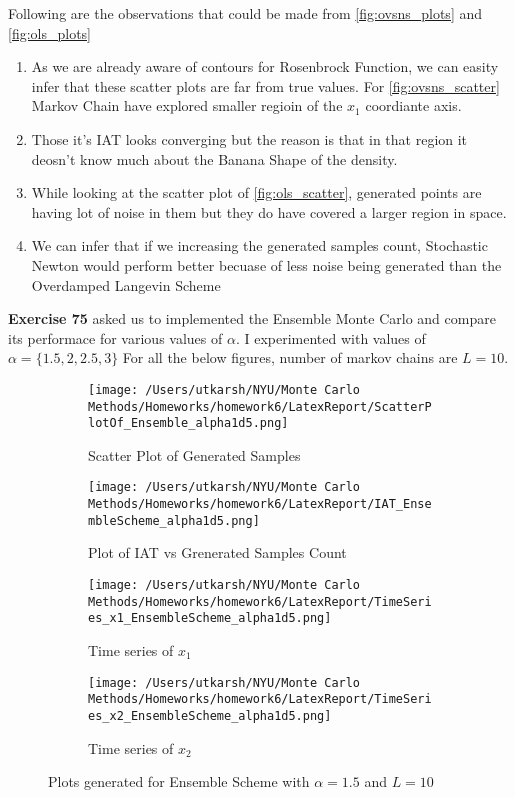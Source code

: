 \documentclass[11pt]{article}
\begin{document}
Following are the observations that could be made from \ref{fig:ovsns_plots} and \ref{fig:ols_plots}
\begin{enumerate}
	\item As we are already aware of contours for Rosenbrock Function, we can easity infer that these scatter plots are far from true values. For \ref{fig:ovsns_scatter} 
	Markov Chain have explored smaller regioin of the $x_1$ coordiante axis.
	\item Those it's IAT looks converging but the reason is that in that region it deosn't know much about the Banana Shape of the density.
	\item While looking at the scatter plot of \ref{fig:ols_scatter}, generated points are having lot of noise in them but they do have covered a larger region in space.
	\item We can infer that if we increasing the generated samples count, Stochastic Newton would perform better becuase of less noise being generated than the Overdamped Langevin Scheme
\end{enumerate}


\textbf{Exercise 75} asked us to implemented the Ensemble Monte Carlo and compare its performace for various values of $\alpha$. I experimented with values of $\alpha  = \{1.5, 2, 2.5, 3\}$
For all the below figures, number of markov chains are $L = 10$.
\begin{figure}[H]
	\centering
	\begin{subfigure}{.22\textwidth}
		\texttt{[image: /Users/utkarsh/NYU/Monte Carlo Methods/Homeworks/homework6/LatexReport/ScatterPlotOf\_Ensemble\_alpha1d5.png]}
		\caption{Scatter Plot of Generated Samples}
		\label{fig:en_1.5_scatter}
	\end{subfigure}
	\begin{subfigure}{.22\textwidth}
		\texttt{[image: /Users/utkarsh/NYU/Monte Carlo Methods/Homeworks/homework6/LatexReport/IAT\_EnsembleScheme\_alpha1d5.png]}
		\caption{Plot of IAT vs Grenerated Samples Count}
		\label{fig:en_1.5_iat}
	\end{subfigure}
	\begin{subfigure}{.22\textwidth}
		\texttt{[image: /Users/utkarsh/NYU/Monte Carlo Methods/Homeworks/homework6/LatexReport/TimeSeries\_x1\_EnsembleScheme\_alpha1d5.png]}
		\caption{Time series of $x_1$}
		\label{fig:en_1.5_time_x1}
	\end{subfigure}
	\begin{subfigure}{.22\textwidth}
		\texttt{[image: /Users/utkarsh/NYU/Monte Carlo Methods/Homeworks/homework6/LatexReport/TimeSeries\_x2\_EnsembleScheme\_alpha1d5.png]}
		\caption{Time series of $x_2$}
		\label{fig:en_1.5_time_x2}
	\end{subfigure}
	\caption{Plots generated for Ensemble Scheme with $\alpha = 1.5$ and $L = 10$}
	\label{fig:en_1.5_plots}
\end{figure}
\end{document}
